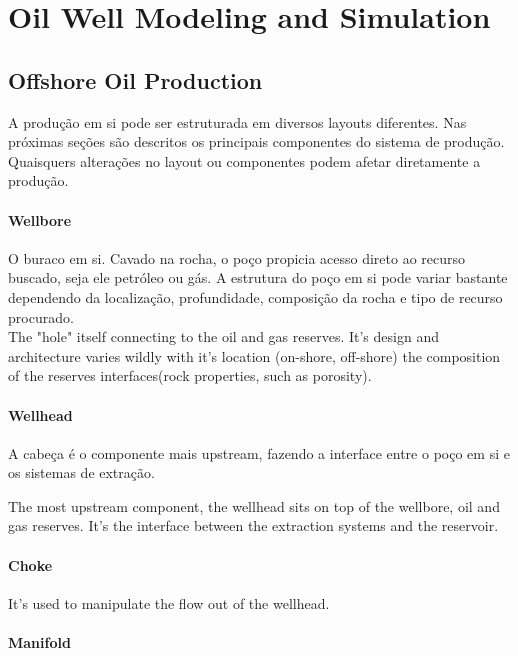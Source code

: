 

\chapter{Oil Well Modeling and Simulation} \label{chap:2}


\section{Offshore Oil Production}

A produção em si pode ser estruturada em diversos layouts diferentes. Nas próximas seções são descritos os principais componentes do sistema de produção.
Quaisquers alterações no layout ou componentes podem afetar diretamente a produção.

\subsubsection{Wellbore}

O buraco em si. Cavado na rocha, o poço propicia acesso direto ao recurso buscado, seja ele petróleo ou gás. A estrutura do poço em si pode variar bastante dependendo da localização, profundidade, composição da rocha e tipo de recurso procurado.
 \\
The "hole" itself connecting to the oil and gas reserves. It's design and architecture varies wildly with it's location (on-shore, off-shore) the composition of the reserves interfaces(rock properties, such as porosity).

\subsubsection{Wellhead}
A cabeça é o componente mais upstream, fazendo a interface entre o poço em si e os sistemas de extração.

The most upstream component, the wellhead sits on top of the wellbore, oil and gas reserves. It's the interface between the extraction systems and the reservoir.

\subsubsection{Choke}
It's used to manipulate the flow out of the wellhead.


\subsubsection{Manifold}



